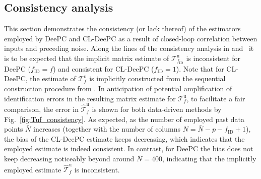 \subsection{Consistency analysis}
\noindent This section demonstrates the consistency (or lack thereof) of the estimators employed by \ac{DeePC} and \ac{CL-DeePC} as a result of closed-loop correlation between inputs and preceding noise. Along the lines of the consistency analysis in  and~\cite{Dinkla2023} it is to be expected that the implicit matrix estimate of $\mathcal{T}_{f_\mathrm{ID}}^\mathrm{u}$ is inconsistent for \ac{DeePC} ($f_\mathrm{ID}=f$) and consistent for \ac{CL-DeePC} ($f_\mathrm{ID}=1$). Note that for \ac{CL-DeePC}, the estimate of $\mathcal{T}_f^\mathrm{u}$ is implicitly constructed from the sequential construction procedure from . In anticipation of potential amplification of identification errors in the resulting matrix estimate for $\mathcal{T}_f^\mathrm{u}$, to facilitate a fair comparison, the error in $\widehat{\mathcal{T}}_f^\mathrm{u}$ is shown for both data-driven methods by Fig.~\ref{fig:Tuf_consistency}. As expected, as the number of employed past data points $\bar{N}$ increases (together with the number of columns $N=\bar{N}-p-f_\mathrm{ID}+1$), the bias of the \ac{CL-DeePC} estimate keeps decreasing, which indicates that the employed estimate is indeed consistent. In contrast, for \ac{DeePC} the bias does not keep decreasing noticeably beyond around $\bar{N}=400$, indicating that the implicitly employed estimate $\widehat{\mathcal{T}}_f^\mathrm{u}$ is inconsistent.
